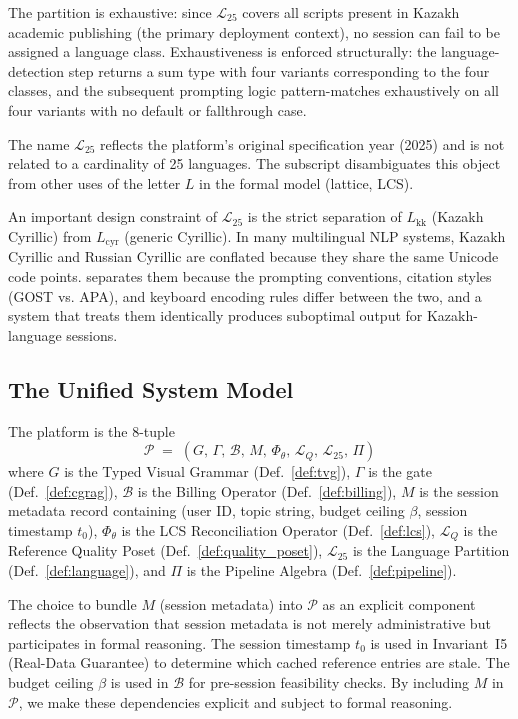 The partition is exhaustive: since $\mathcal{L}_{25}$ covers all scripts present
in Kazakh academic publishing (the primary deployment context), no session can fail
to be assigned a language class.
Exhaustiveness is enforced structurally: the language-detection step returns a sum type
with four variants corresponding to the four classes, and the subsequent prompting
logic pattern-matches exhaustively on all four variants with no default or fallthrough case.

The name $\mathcal{L}_{25}$ reflects the platform's original specification year
(2025) and is not related to a cardinality of 25 languages.
The subscript disambiguates this object from other uses of the letter $L$ in the
formal model (lattice, LCS).

An important design constraint of $\mathcal{L}_{25}$ is the strict separation of
$L_{\mathrm{kk}}$ (Kazakh Cyrillic) from $L_{\mathrm{cyr}}$ (generic Cyrillic).
In many multilingual NLP systems, Kazakh Cyrillic and Russian Cyrillic are conflated
because they share the same Unicode code points.
\sys{} separates them because the prompting conventions, citation styles (GOST vs.
APA), and keyboard encoding rules differ between the two, and a system that treats
them identically produces suboptimal output for Kazakh-language sessions.

\subsection{The Unified System Model}

\begin{definition}
\label{def:unified}
The \sys{} platform is the 8-tuple
\[
  \mathcal{P} \;=\; (G,\,\Gamma,\,\mathcal{B},\,M,\,\Phi_\theta,\,\mathcal{L}_Q,\,\mathcal{L}_{25},\,\Pi)
\]
where $G$ is the Typed Visual Grammar (Def.~\ref{def:tvg}),
$\Gamma$ is the \cgrag{} gate (Def.~\ref{def:cgrag}),
$\mathcal{B}$ is the Billing Operator (Def.~\ref{def:billing}),
$M$ is the session metadata record containing (user ID, topic string, budget ceiling
$\beta$, session timestamp $t_0$),
$\Phi_\theta$ is the LCS Reconciliation Operator (Def.~\ref{def:lcs}),
$\mathcal{L}_Q$ is the Reference Quality Poset (Def.~\ref{def:quality_poset}),
$\mathcal{L}_{25}$ is the Language Partition (Def.~\ref{def:language}), and
$\Pi$ is the Pipeline Algebra (Def.~\ref{def:pipeline}).
\end{definition}

The choice to bundle $M$ (session metadata) into $\mathcal{P}$ as an explicit component
reflects the observation that session metadata is not merely administrative but participates
in formal reasoning.
The session timestamp $t_0$ is used in Invariant~I5 (Real-Data Guarantee) to determine
which cached reference entries are stale.
The budget ceiling $\beta$ is used in $\mathcal{B}$ for pre-session feasibility checks.
By including $M$ in $\mathcal{P}$, we make these dependencies explicit and subject to
formal reasoning.

